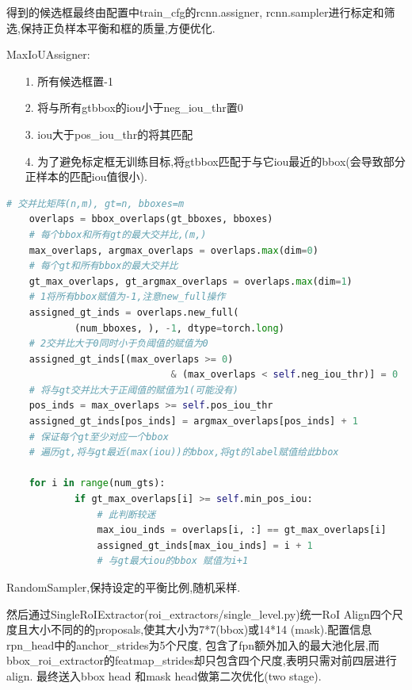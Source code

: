 \documentclass[UTF8]{ctexart}
\begin{document}
得到的候选框最终由配置中train\_cfg的rcnn.assigner, rcnn.sampler进行标定和筛选,保持正负样本平衡和框的质量,方便优化.

MaxIoUAssigner:
\label{sub:MaxIoUAssigner}
\begin{adjustwidth}{1cm}{0cm}
\begin{itemize}
	\item[1.] 所有候选框置-1
	\item[2.] 将与所有gtbbox的iou小于neg\_iou\_thr置0
	\item[3.] iou大于pos\_iou\_thr的将其匹配
	\item[4.] 为了避免标定框无训练目标,将gtbbox匹配于与它iou最近的bbox(会导致部分正样本的匹配iou值很小).
\end{itemize}
\end{adjustwidth}


\lstset{style=mystyle}
\begin{lstlisting}[language=Python]
	# 交并比矩阵(n,m), gt=n, bboxes=m
	overlaps = bbox_overlaps(gt_bboxes, bboxes)
	# 每个bbox和所有gt的最大交并比,(m,)
	max_overlaps, argmax_overlaps = overlaps.max(dim=0)
	# 每个gt和所有bbox的最大交并比
	gt_max_overlaps, gt_argmax_overlaps = overlaps.max(dim=1)
	# 1将所有bbox赋值为-1,注意new_full操作
	assigned_gt_inds = overlaps.new_full(
			(num_bboxes, ), -1, dtype=torch.long)
	# 2交并比大于0同时小于负阈值的赋值为0
	assigned_gt_inds[(max_overlaps >= 0)
							 & (max_overlaps < self.neg_iou_thr)] = 0
	# 将与gt交并比大于正阈值的赋值为1(可能没有)
	pos_inds = max_overlaps >= self.pos_iou_thr
	assigned_gt_inds[pos_inds] = argmax_overlaps[pos_inds] + 1
	# 保证每个gt至少对应一个bbox
	# 遍历gt,将与gt最近(max(iou))的bbox,将gt的label赋值给此bbox

	for i in range(num_gts):
			if gt_max_overlaps[i] >= self.min_pos_iou:
				# 此判断较迷
				max_iou_inds = overlaps[i, :] == gt_max_overlaps[i]
				assigned_gt_inds[max_iou_inds] = i + 1 
				# 与gt最大iou的bbox 赋值为i+1

\end{lstlisting}

RandomSampler,保持设定的平衡比例,随机采样.

然后通过SingleRoIExtractor(roi\_extractors/single\_level.py)统一RoI
Align四个尺度且大小不同的的proposals,使其大小为7*7(bbox)或14*14
(mask).配置信息rpn\_head中的anchor\_strides为5个尺度,
包含了fpn额外加入的最大池化层,而bbox\_roi\_extractor的featmap\_strides却只包含四个尺度,表明只需对前四层进行align.
最终送入bbox head 和mask head做第二次优化(two stage).
\end{document}
